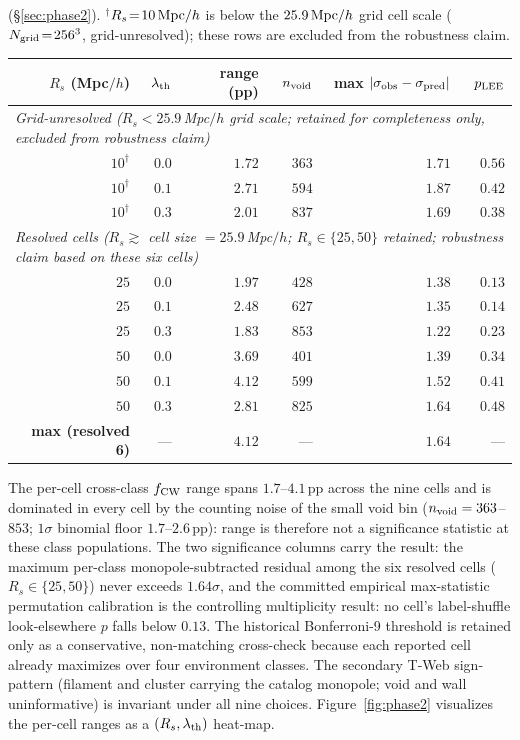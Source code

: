 \documentclass[twocolumn,linenumbers]{aastex702}
\begin{document}
\begin{table}[!tp]
{(\S\ref{sec:phase2}). $^\dagger$$R_s\!=\!10\,{\rm Mpc}/h$ is below the
$25.9\,{\rm Mpc}/h$ grid cell scale ($N_{\rm grid}\!=\!256^3$, grid-unresolved);
these rows are excluded from the robustness claim.}
\label{tab:phase2}
\begin{ruledtabular}
\begin{tabular}{rrrrrr}
$R_s$ (Mpc$/h$) & $\lambda_{\rm th}$ & range (pp) & $n_{\rm void}$ &
max $|\sigma_{\rm obs}-\sigma_{\rm pred}|$ & $p_{\rm LEE}$ \\
\hline
\multicolumn{6}{l}{\textit{Grid-unresolved ($R_s < 25.9$\,Mpc$/h$ grid scale; retained for completeness only, excluded from robustness claim)}} \\
$10^\dagger$ & $0.0$ & $1.72$ & $363$ & $1.71$ & $0.56$ \\
$10^\dagger$ & $0.1$ & $2.71$ & $594$ & $1.87$ & $0.42$ \\
$10^\dagger$ & $0.3$ & $2.01$ & $837$ & $1.69$ & $0.38$ \\
\hline
\multicolumn{6}{l}{\textit{Resolved cells ($R_s \gtrsim$ cell size $= 25.9$\,Mpc$/h$; $R_s \in \{25, 50\}$ retained; robustness claim based on these six cells)}} \\
$25$ & $0.0$ & $1.97$ & $428$ & $1.38$ & $0.13$ \\
$25$ & $0.1$ & $2.48$ & $627$ & $1.35$ & $0.14$ \\
$25$ & $0.3$ & $1.83$ & $853$ & $1.22$ & $0.23$ \\
$50$ & $0.0$ & $3.69$ & $401$ & $1.39$ & $0.34$ \\
$50$ & $0.1$ & $4.12$ & $599$ & $1.52$ & $0.41$ \\
$50$ & $0.3$ & $2.81$ & $825$ & $1.64$ & $0.48$ \\
\hline
\textbf{max (resolved 6)} & --- & $\mathbf{4.12}$ & --- &
$\mathbf{1.64}$ & --- \\
\end{tabular}
\end{ruledtabular}
\end{table}

The per-cell cross-class $f_{\rm CW}$ range spans $1.7$--$4.1$\,pp
across the nine cells and is dominated in every cell by the
counting noise of the small void bin ($n_{\rm void} = 363$--$853$;
$1\sigma$ binomial floor $1.7$--$2.6$\,pp): range is therefore not a
significance statistic at these class populations. The two
significance columns carry the result: the maximum per-class
monopole-subtracted residual among the six resolved cells ($R_s \in
\{25, 50\}$) never exceeds $1.64\sigma$, and the committed empirical
max-statistic permutation calibration is the controlling multiplicity
result: no cell's label-shuffle look-elsewhere $p$ falls below $0.13$.
The historical Bonferroni-9 threshold is retained only as a conservative,
non-matching cross-check because each reported cell already maximizes over
four environment classes.
The secondary T-Web sign-pattern (filament and
cluster carrying the catalog monopole; void and wall uninformative) is
invariant under all nine choices. Figure~\ref{fig:phase2} visualizes
the per-cell ranges as a $(R_s, \lambda_{\rm th})$ heat-map.
\end{document}
